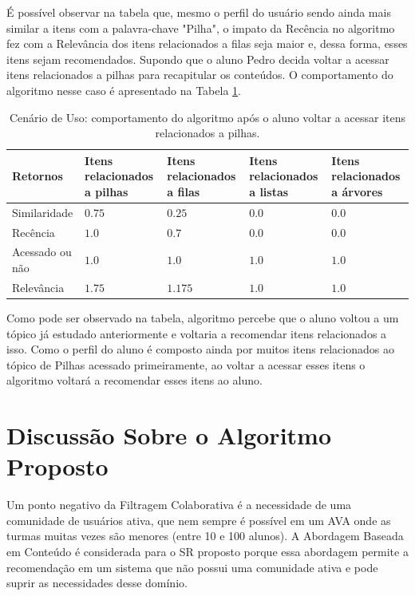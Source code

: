 É possível observar na tabela que, mesmo o perfil do usuário sendo ainda mais similar a itens com a palavra-chave "Pilha",
o impato da Recência no algoritmo fez com a Relevância dos itens relacionados a filas seja maior e, dessa forma, esses
itens sejam recomendados. Supondo que o aluno Pedro decida voltar a acessar itens relacionados a pilhas para
recapitular os conteúdos. O comportamento do algoritmo nesse caso é apresentado na Tabela \ref{tab:cenario-de-uso-3}.

\begin{table}[hp]
\footnotesize
\caption[Cenário de Uso: comportamento do algoritmo após o aluno voltar a acessar itens relacionados a pilhas.]{Cenário de Uso: comportamento do algoritmo após o aluno voltar a acessar itens relacionados a pilhas.}
\label{tab:cenario-de-uso-3}
\centering
\begin{tabular}{|p{2cm}|p{3cm}|p{3cm}|p{3cm}|p{3cm}|}
  \hline
  \textbf{Retornos} & \textbf{Itens relacionados a pilhas} & \textbf{Itens relacionados a filas} & \textbf{Itens relacionados a listas} & \textbf{Itens relacionados a árvores} \\
  \hline
  Similaridade & $0.75$ & $0.25$ & $0.0$ & $0.0$ \\
  \hline
  Recência & $1.0$ & $0.7$ & $0.0$ & $0.0$ \\
  \hline
  Acessado ou não & $1.0$ & $1.0$ & $1.0$ & $1.0$ \\
  \hline
  Relevância & $1.75$ & $1.175$ & $1.0$ & $1.0$ \\
  \hline
\end{tabular}
\end{table}

Como pode ser observado na tabela, algoritmo percebe que o aluno voltou a um tópico já estudado anteriormente e
voltaria a recomendar itens relacionados a isso. Como o perfil do aluno é composto ainda por muitos itens relacionados ao tópico
de Pilhas acessado primeiramente, ao voltar a acessar esses itens o algoritmo voltará a recomendar esses itens
ao aluno.

\section{Discussão Sobre o Algoritmo Proposto}

Um ponto negativo da Filtragem Colaborativa é a necessidade de uma comunidade de usuários ativa, que nem sempre é
possível em um AVA onde as turmas muitas vezes são menores (entre 10 e 100 alunos). A Abordagem Baseada
em Conteúdo é considerada para o SR proposto porque essa abordagem permite a recomendação em um sistema que não possui uma
comunidade ativa e pode suprir as necessidades desse domínio.

